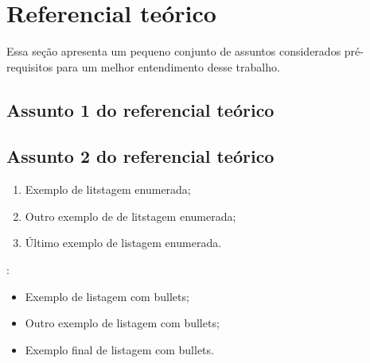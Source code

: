 \chapter{Referencial teórico}
\label{cap:referencial_teorico}

Essa seção apresenta um pequeno conjunto de assuntos considerados pré-requisitos para um melhor entendimento desse trabalho.

\lipsum[22]

\section{Assunto 1 do referencial teórico} \label{sub:assunto2}

\lipsum[23-27]

\section{Assunto 2 do referencial teórico}

\lipsum[23-27]

\begin{enumerate}
    \item Exemplo de litstagem enumerada;
    \item Outro exemplo de de litstagem enumerada;
    \item Último exemplo de listagem enumerada.
\end{enumerate}

\lipsum[28]:

\begin{itemize}
    \item Exemplo de listagem com bullets;
    \item Outro exemplo de listagem com bullets; 
    \item Exemplo final de listagem com bullets. 
\end{itemize}
